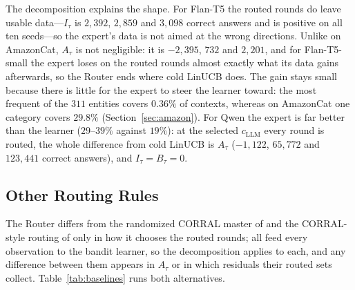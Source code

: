 \documentclass[anon]{alt2027} %
\begin{document}
The decomposition explains the shape. For Flan-T5 the routed rounds do leave
usable data---$I_\tau$ is $2{,}392$, $2{,}859$ and $3{,}098$ correct answers and is
positive on all ten seeds---so the expert's data is not aimed at the wrong
directions. Unlike on AmazonCat,
$A_\tau$ is not negligible: it is $-2{,}395$, $732$ and $2{,}201$, and for
Flan-T5-small the expert loses on the routed rounds almost exactly what its
data gains afterwards, so the Router ends where cold LinUCB does. The gain stays small
because there is little for the expert to steer the learner toward: the most
frequent of the $311$ entities covers $0.36\%$ of contexts, whereas on
AmazonCat one category covers $29.8\%$ (Section~\ref{sec:amazon}). For Qwen the expert is far better than the
learner ($29$--$39\%$ against $19\%$): at the selected $c_{\mathrm{LLM}}$ every round
is routed, the whole difference from cold LinUCB is $A_\tau$ ($-1{,}122$,
$65{,}772$ and $123{,}441$ correct answers), and $I_\tau=B_\tau=0$.

\subsection{Other Routing Rules}
\label{app:routers}

The Router differs from the randomized CORRAL master of
\citet{agarwal2017corralling} and the CORRAL-style routing of
\citet{chen2024llmdecision} only in how it chooses the routed rounds; all
feed every observation to the bandit learner, so the decomposition applies
to each, and any difference between them appears in $A_\tau$ or in which
residuals their routed sets collect. Table~\ref{tab:baselines} runs both alternatives.
\end{document}
